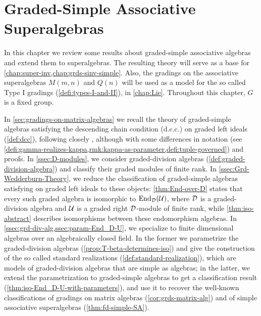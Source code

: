 \chapter{Graded-Simple Associative Superalgebras}\label{chap:grd-simple-assc}

In this chapter we review some results about graded-simple associative algebras and extend them to superalgebras. 
The resulting theory will serve as a base for \cref{chap:super-inv,chap:grds-sinv-simple}. 
Also, the gradings on the associative superalgebras $M(m,n)$ and $Q(n)$ will be used as a model for the so called Type I gradings (\cref{defi:types-I-and-II}), in \cref{chap:Lie}.
Throughout this chapter, $G$ is a fixed group. 

In \cref{sec:gradings-on-matrix-algebras} we recall the theory of graded-simple algebras satisfying the descending chain condition (d.c.c.) on graded left ideals (\cref{def:dcc}), following closely \cite[Chapter 2]{livromicha}, although with some differences in notation (see \cref{defi:gamma-realizes-kappa,rmk:kappa-as-parameter,defi:tuple-governed}) and proofs. 
In \cref{ssec:D-modules}, we consider graded-division algebras (\cref{def:graded-division-algebra}) and classify their graded modules of finite rank. 
In \cref{ssec:Grd-Wedderburn-Theory}, we reduce the classification of graded-simple algebras satisfying \dcc on graded left ideals to these objects:  \cref{thm:End-over-D} states that every such graded algebra is isomorphic to $\operatorname{End}_{\mathcal{D}} (\mathcal U)$, where $\mathcal{D}$ is a graded-division algebra and $\mathcal U$ is a graded right $\mathcal{D}$-module of finite rank, while \cref{thm:iso-abstract} describes isomorphisms between these endomorphism algebras. 
In \cref{ssec:grd-div-alg,ssec:param-End_D-U}, we specialize to finite dimensional algebras over an algebraically closed field. 
In the former we parametrize the graded-division algebras (\cref{prop:T-beta-determines-iso})
and give the construction of the so called standard realizations (\cref{def:standard-realization}), which are models of graded-division algebras that are simple as algebras; in the latter, we extend the parametrization to graded-simple algebras to get a classification result (\cref{thm:iso-End_D-U-with-parameters}), and use it to recover the well-known classifications of gradings on matrix algebras (\cref{cor:grds-matrix-alg}) and of simple associative superalgebras (\cref{thm:fd-simple-SA}). 

